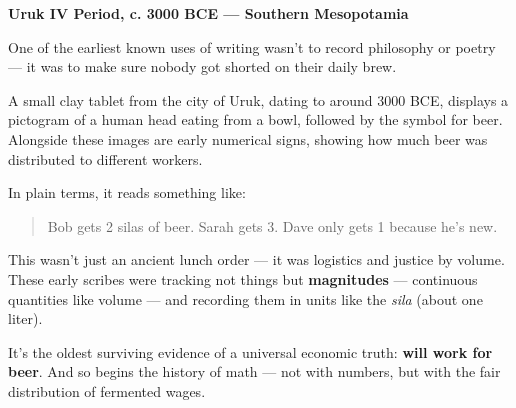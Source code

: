\begin{tcolorbox}[title=Historical Sidebar: \textit{Will Work for Beer}, colback=gray!5, colframe=black, fonttitle=\bfseries]

  \textbf{Uruk IV Period, c. 3000 BCE — Southern Mesopotamia}

  \medskip
  
  One of the earliest known uses of writing wasn’t to record philosophy or poetry — it was to make sure nobody got shorted on their daily brew.

  \medskip
  
  A small clay tablet from the city of Uruk, dating to around 3000 BCE, displays a pictogram of a human head eating from a bowl, followed by the symbol for beer. Alongside these images are early numerical signs, showing how much beer was distributed to different workers.
  
  \medskip
  
  In plain terms, it reads something like:

  \medskip
  
  \begin{quote}
  Bob gets 2 silas of beer. Sarah gets 3. Dave only gets 1 because he’s new.
  \end{quote}
  
  \medskip
  
  This wasn’t just an ancient lunch order — it was logistics and justice by volume. These early scribes were tracking not things but \textbf{magnitudes} — continuous quantities like volume — and recording them in units like the \textit{sila} (about one liter).
  
  \medskip
  
  It’s the oldest surviving evidence of a universal economic truth: \textbf{will work for beer}. And so begins the history of math — not with numbers, but with the fair distribution of fermented wages.
  
\end{tcolorbox}
  



